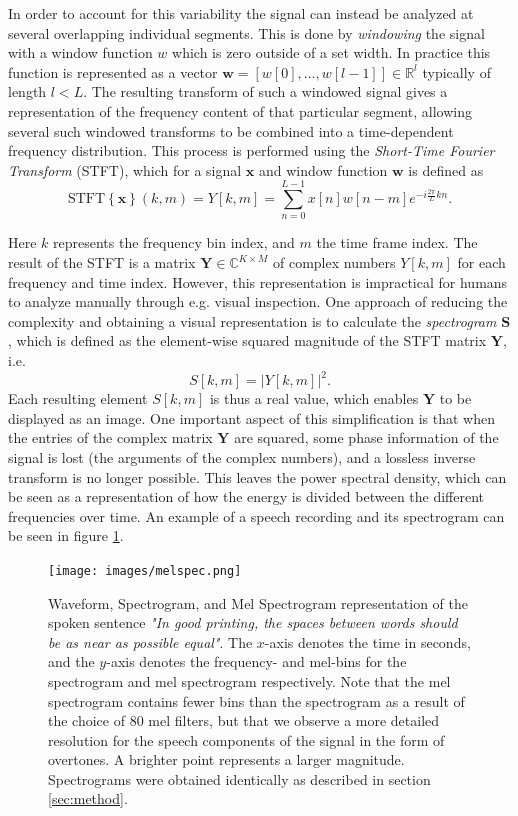 \documentclass{report}
\begin{document}
In order to account for this variability the signal can instead be analyzed at several overlapping individual segments. This is done by \textit{windowing} the signal with a window function $w$ which is zero outside of a set width. In practice this function is represented as a vector $\bm{w}=[w[0],\dots, w[l-1]] \in \mathbb{R}^l$ typically of length $l<L$. The resulting transform of such a windowed signal gives a representation of the frequency content of that particular segment, allowing several such windowed transforms to be combined into a time-dependent frequency distribution. This process is performed using the \textit{Short-Time Fourier Transform} (STFT), which for a signal $\bm{x}$ and window function $\bm{w}$ is defined as
\begin{equation} \label{eq:spec}
    \text{STFT}\left\{ \bm{x} \right\}(k, m) = Y[k, m] = \sum_{n=0}^{L-1} x[n]w[n-m]e^{-i \frac{2\pi}{L}k n}.
\end{equation}

Here $k$ represents the frequency bin index, and $m$ the time frame index. The result of the STFT is a matrix $\bm{Y} \in \mathbb{C}^{K \times M}$ of complex numbers $Y[k, m]$ for each frequency and time index. However, this representation is impractical for humans to analyze manually through e.g. visual inspection. One approach of reducing the complexity and obtaining a visual representation is to calculate the \textit{spectrogram} $\bm{S}$, which is defined as the element-wise squared magnitude of the STFT matrix $\bm{Y}$, i.e.
\begin{equation}
    S[k, m] = \left| Y[k, m] \right|^2.
\end{equation}
Each resulting element $S[k, m]$ is thus a real value, which enables $\bm{Y}$ to be displayed as an image. One important aspect of this simplification is that when the entries of the complex matrix $\bm{Y}$ are squared, some phase information of the signal is lost (the arguments of the complex numbers), and a lossless inverse transform is no longer possible. This leaves the power spectral density, which can be seen as a representation of how the energy is divided between the different frequencies over time. An example of a speech recording and its spectrogram can be seen in figure \ref{fig:melspec}.

\begin{figure}[H]
    \centering
    \texttt{[image: images/melspec.png]}
    \caption{\onehalfspacing Waveform, Spectrogram, and Mel Spectrogram representation of the spoken sentence \textit{"In good printing, the spaces between words should be as near as possible equal"}. The $x$-axis denotes the time in seconds, and the $y$-axis denotes the frequency- and mel-bins for the spectrogram and mel spectrogram respectively. Note that the mel spectrogram contains fewer bins than the spectrogram as a result of the choice of 80 mel filters, but that we observe a more detailed resolution for the speech components of the signal in the form of overtones. A brighter point represents a larger magnitude. Spectrograms were obtained identically as described in section \ref{sec:method}.}
    \label{fig:melspec}
\end{figure}
\end{document}
